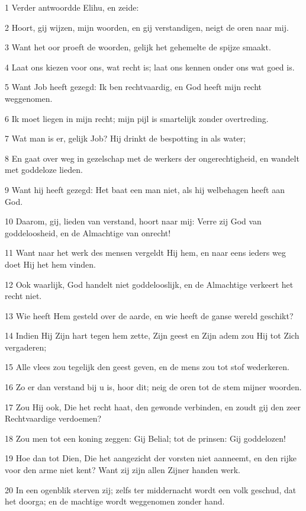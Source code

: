 \par 1 Verder antwoordde Elihu, en zeide:
\par 2 Hoort, gij wijzen, mijn woorden, en gij verstandigen, neigt de oren naar mij.
\par 3 Want het oor proeft de woorden, gelijk het gehemelte de spijze smaakt.
\par 4 Laat ons kiezen voor ons, wat recht is; laat ons kennen onder ons wat goed is.
\par 5 Want Job heeft gezegd: Ik ben rechtvaardig, en God heeft mijn recht weggenomen.
\par 6 Ik moet liegen in mijn recht; mijn pijl is smartelijk zonder overtreding.
\par 7 Wat man is er, gelijk Job? Hij drinkt de bespotting in als water;
\par 8 En gaat over weg in gezelschap met de werkers der ongerechtigheid, en wandelt met goddeloze lieden.
\par 9 Want hij heeft gezegd: Het baat een man niet, als hij welbehagen heeft aan God.
\par 10 Daarom, gij, lieden van verstand, hoort naar mij: Verre zij God van goddeloosheid, en de Almachtige van onrecht!
\par 11 Want naar het werk des mensen vergeldt Hij hem, en naar eens ieders weg doet Hij het hem vinden.
\par 12 Ook waarlijk, God handelt niet goddelooslijk, en de Almachtige verkeert het recht niet.
\par 13 Wie heeft Hem gesteld over de aarde, en wie heeft de ganse wereld geschikt?
\par 14 Indien Hij Zijn hart tegen hem zette, Zijn geest en Zijn adem zou Hij tot Zich vergaderen;
\par 15 Alle vlees zou tegelijk den geest geven, en de mens zou tot stof wederkeren.
\par 16 Zo er dan verstand bij u is, hoor dit; neig de oren tot de stem mijner woorden.
\par 17 Zou Hij ook, Die het recht haat, den gewonde verbinden, en zoudt gij den zeer Rechtvaardige verdoemen?
\par 18 Zou men tot een koning zeggen: Gij Belial; tot de prinsen: Gij goddelozen!
\par 19 Hoe dan tot Dien, Die het aangezicht der vorsten niet aanneemt, en den rijke voor den arme niet kent? Want zij zijn allen Zijner handen werk.
\par 20 In een ogenblik sterven zij; zelfs ter middernacht wordt een volk geschud, dat het doorga; en de machtige wordt weggenomen zonder hand.
